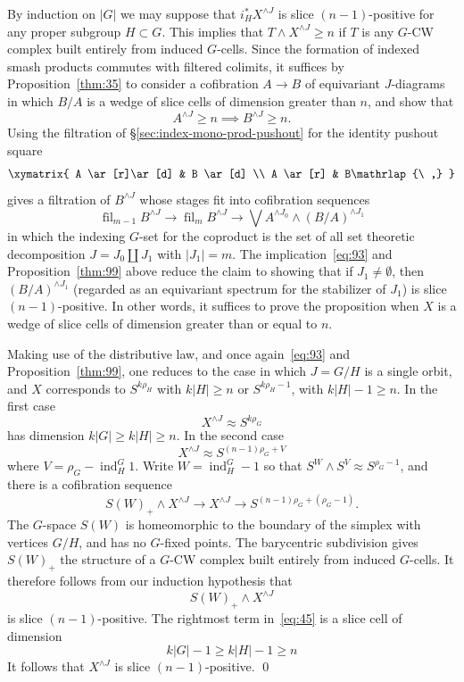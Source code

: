 \documentclass{amsart}
\theoremstyle{definition}
\theoremstyle{remark}
\newenvironment{pf}{\bigskip{\em Proof:\/}}{\qed\medskip}
\DeclareMathOperator{\fil}{fil}
\DeclareMathOperator{\ind}{ind}
\begin{document}
\begin{pf}
By induction on $|G|$ we may suppose that $i_{H}^{\ast}X^{\wedge J}$
is slice $(n-1)$-positive for any proper subgroup $H\subset G$.  This
implies that $T\wedge X^{\wedge J} \ge n$ if $T$ is any $G$-CW complex
built entirely from induced $G$-cells.  Since the formation of indexed
smash products commutes with filtered colimits, it suffices by
Proposition~\ref{thm:35} to consider a cofibration $A\to B$ of
equivariant $J$-diagrams in which $B/A$ is a wedge of slice cells of
dimension greater than $n$, and show that
\begin{equation}
\label{eq:63}
A^{\wedge J}\ge n \implies B^{\wedge J} \ge n.
\end{equation}
Using the filtration of \S\ref{sec:index-mono-prod-pushout} for the
identity pushout square
\[
\xymatrix{
A  \ar[r]\ar[d]  & B
\ar[d] \\
A  \ar[r]        & B\mathrlap{\ ,}
}
\]
gives a filtration of $B^{\wedge J}$ whose stages fit into cofibration
sequences
\begin{equation}
\label{eq:62}
\fil_{m-1}B^{\wedge J} \to \fil_{m}B^{\wedge J} \to \bigvee A^{\wedge
J_{0}}\wedge (B/A)^{\wedge J_{1}}
\end{equation}
in which the indexing $G$-set for the coproduct is the set of all set
theoretic decomposition $J=J_{0}\coprod J_{1}$ with $|J_{1}|=m$.  The
implication~\eqref{eq:93} and Proposition~\ref{thm:99} above reduce
the claim to showing that if $J_{1}\ne\emptyset$, then $(B/A)^{\wedge
J_{1}}$ (regarded as an equivariant spectrum for the stabilizer of
$J_{1}$) is slice $(n-1)$-positive.  In other words, it suffices to
prove the proposition when $X$ is a wedge of slice cells of dimension
greater than or equal to $n$.

Making use of the distributive law, and once again~\eqref{eq:93} and
Proposition~\ref{thm:99}, one reduces to the case in which $J=G/H$ is
a single orbit, and $X$ corresponds to $S^{k\rho_{H}}$ with $k|H|\ge n$
or $S^{k\rho_{H}-1}$, with $k|H| -1 \ge n$.  In the first case
\[
X^{\wedge J } \approx S^{k\rho_{G}} 
\]
has dimension $k|G|\ge k|H|\ge n$.  In the second case
\[
X^{\wedge J } \approx S^{(n-1)\rho_{G}+V}
\]
where $V=\rho_{G}-\ind_{H}^{G}1$.   Write $W=\ind_{H}^{G}-1$ so that
$S^{W}\wedge S^{V} \approx S^{\rho_{G}-1}$, and there is a cofibration
sequence 
\begin{equation}
\label{eq:45}
S(W)_{+}\wedge X^{\wedge J} \to X^{\wedge J} \to S^{(n-1)\rho_{G}+(\rho_{G}-1)}.
\end{equation}
The $G$-space $S(W)$ is homeomorphic to the boundary of the simplex
with vertices $G/H$, and has no $G$-fixed points.  The barycentric
subdivision gives $S(W)_{+}$ the structure of a $G$-CW complex built
entirely from induced $G$-cells.  It therefore follows from our induction
hypothesis that
\[
S(W)_{+}\wedge X^{\wedge J}
\]
is slice $(n-1)$-positive.  The rightmost term in~\eqref{eq:45} is a
slice cell of dimension
\[
k|G| -1 \ge k|H|-1 \ge n
\]
It follows that $X^{\wedge J}$ is slice $(n-1)$-positive.
\end{pf}
\end{document}

